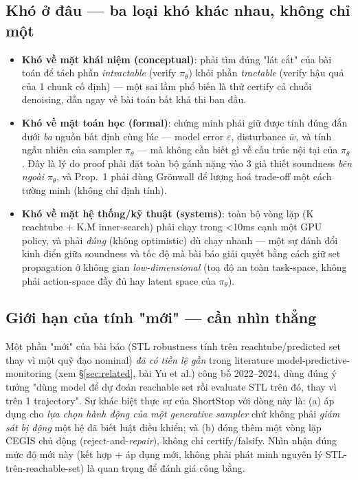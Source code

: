 \documentclass[a4paper,12pt]{article}
\begin{document}
\subsection{Khó ở đâu — ba loại khó khác nhau, không chỉ một}
\begin{itemize}
  \item \textbf{Khó về mặt khái niệm (conceptual)}: phải tìm đúng "lát cắt" của bài toán để tách phần \emph{intractable} (verify $\pi_\theta$) khỏi phần \emph{tractable} (verify hậu quả của 1 chunk cố định) --- một sai lầm phổ biến là thử certify cả chuỗi denoising, dẫn ngay về bài toán bất khả thi ban đầu.
  \item \textbf{Khó về mặt toán học (formal)}: chứng minh phải giữ được tính đúng đắn dưới \emph{ba} nguồn bất định cùng lúc --- model error $\varepsilon$, disturbance $\bar w$, và tính ngẫu nhiên của sampler $\pi_\theta$ --- mà không cần biết gì về cấu trúc nội tại của $\pi_\theta$. Đây là lý do proof phải đặt toàn bộ gánh nặng vào 3 giả thiết soundness \emph{bên ngoài} $\pi_\theta$, và Prop.~1 phải dùng Grönwall để lượng hoá trade-off một cách tường minh (không chỉ định tính).
  \item \textbf{Khó về mặt hệ thống/kỹ thuật (systems)}: toàn bộ vòng lặp (K reachtube + K.M inner-search) phải chạy trong <10ms cạnh một GPU policy, và phải \emph{đúng} (không optimistic) dù chạy nhanh --- một sự đánh đổi kinh điển giữa soundness và tốc độ mà bài báo giải quyết bằng cách giữ set propagation ở không gian \emph{low-dimensional} (toạ độ an toàn task-space, không phải action-space đầy đủ hay latent space của $\pi_\theta$).
\end{itemize}

\subsection{Giới hạn của tính "mới" — cần nhìn thẳng}
Một phần "mới" của bài báo (STL robustness tính trên reachtube/predicted set thay vì một quỹ đạo nominal) \emph{đã có tiền lệ gần} trong literature model-predictive-monitoring (xem \S\ref{sec:related}, bài Yu et al.) công bố 2022--2024, dùng đúng ý tưởng "dùng model để dự đoán reachable set rồi evaluate STL trên đó, thay vì trên 1 trajectory". Sự khác biệt thực sự của ShortStop với dòng này là: (a) áp dụng cho \emph{lựa chọn hành động của một generative sampler} chứ không phải \emph{giám sát bị động} một hệ đã biết luật điều khiển; và (b) đóng thêm một vòng lặp CEGIS chủ động (reject-and-\emph{repair}), không chỉ certify/falsify. Nhìn nhận đúng mức độ mới này (kết hợp + áp dụng mới, không phải phát minh nguyên lý STL-trên-reachable-set) là quan trọng để đánh giá công bằng.
\end{document}
